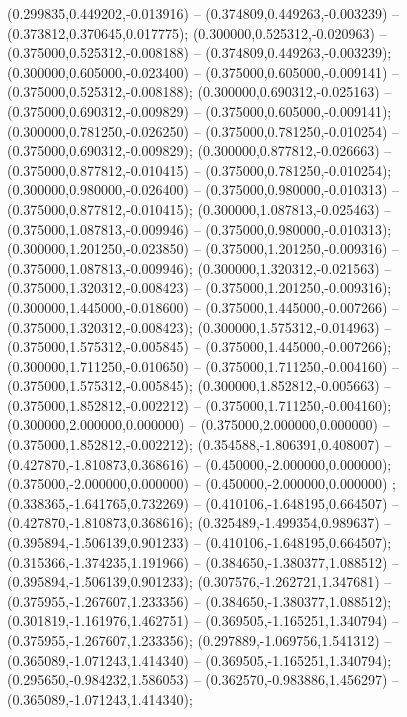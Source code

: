  (0.299835,0.449202,-0.013916) -- (0.374809,0.449263,-0.003239) -- (0.373812,0.370645,0.017775);
 (0.300000,0.525312,-0.020963) -- (0.375000,0.525312,-0.008188) -- (0.374809,0.449263,-0.003239);
 (0.300000,0.605000,-0.023400) -- (0.375000,0.605000,-0.009141) -- (0.375000,0.525312,-0.008188);
 (0.300000,0.690312,-0.025163) -- (0.375000,0.690312,-0.009829) -- (0.375000,0.605000,-0.009141);
 (0.300000,0.781250,-0.026250) -- (0.375000,0.781250,-0.010254) -- (0.375000,0.690312,-0.009829);
 (0.300000,0.877812,-0.026663) -- (0.375000,0.877812,-0.010415) -- (0.375000,0.781250,-0.010254);
 (0.300000,0.980000,-0.026400) -- (0.375000,0.980000,-0.010313) -- (0.375000,0.877812,-0.010415);
 (0.300000,1.087813,-0.025463) -- (0.375000,1.087813,-0.009946) -- (0.375000,0.980000,-0.010313);
 (0.300000,1.201250,-0.023850) -- (0.375000,1.201250,-0.009316) -- (0.375000,1.087813,-0.009946);
 (0.300000,1.320312,-0.021563) -- (0.375000,1.320312,-0.008423) -- (0.375000,1.201250,-0.009316);
 (0.300000,1.445000,-0.018600) -- (0.375000,1.445000,-0.007266) -- (0.375000,1.320312,-0.008423);
 (0.300000,1.575312,-0.014963) -- (0.375000,1.575312,-0.005845) -- (0.375000,1.445000,-0.007266);
 (0.300000,1.711250,-0.010650) -- (0.375000,1.711250,-0.004160) -- (0.375000,1.575312,-0.005845);
 (0.300000,1.852812,-0.005663) -- (0.375000,1.852812,-0.002212) -- (0.375000,1.711250,-0.004160);
 (0.300000,2.000000,0.000000) -- (0.375000,2.000000,0.000000) -- (0.375000,1.852812,-0.002212);
 (0.354588,-1.806391,0.408007) -- (0.427870,-1.810873,0.368616) -- (0.450000,-2.000000,0.000000);
 (0.375000,-2.000000,0.000000) -- (0.450000,-2.000000,0.000000) ;
 (0.338365,-1.641765,0.732269) -- (0.410106,-1.648195,0.664507) -- (0.427870,-1.810873,0.368616);
 (0.325489,-1.499354,0.989637) -- (0.395894,-1.506139,0.901233) -- (0.410106,-1.648195,0.664507);
 (0.315366,-1.374235,1.191966) -- (0.384650,-1.380377,1.088512) -- (0.395894,-1.506139,0.901233);
 (0.307576,-1.262721,1.347681) -- (0.375955,-1.267607,1.233356) -- (0.384650,-1.380377,1.088512);
 (0.301819,-1.161976,1.462751) -- (0.369505,-1.165251,1.340794) -- (0.375955,-1.267607,1.233356);
 (0.297889,-1.069756,1.541312) -- (0.365089,-1.071243,1.414340) -- (0.369505,-1.165251,1.340794);
 (0.295650,-0.984232,1.586053) -- (0.362570,-0.983886,1.456297) -- (0.365089,-1.071243,1.414340);
